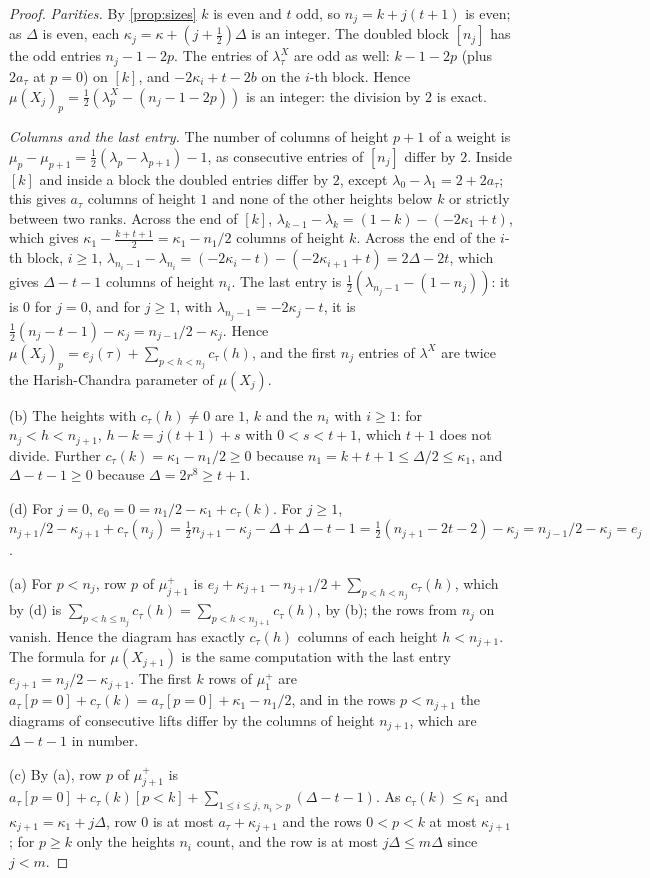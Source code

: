 \begin{proof}
\emph{Parities.} By \cref{prop:sizes} $k$ is even and $t$ odd, so $n_j=k+j(t+1)$ is even; as $\Delta$ is even, each $\kappa_j=\kappa+(j+\frac12)\Delta$ is an integer. The doubled block $[n_j]$ has the odd entries $n_j-1-2p$. The entries of $\lambda^X_\tau$ are odd as well: $k-1-2p$ (plus $2a_\tau$ at $p=0$) on $[k]$, and $-2\kappa_i+t-2b$ on the $i$-th block. Hence
$\mu(X_j)_p=\frac12(\lambda^X_p-(n_j-1-2p))$ is an integer: the division by $2$ is exact.

\emph{Columns and the last entry.} The number of columns of height $p+1$ of a weight is $\mu_p-\mu_{p+1}=\frac12(\lambda_p-\lambda_{p+1})-1$, as consecutive entries of $[n_j]$ differ by $2$. Inside $[k]$ and inside a block the doubled entries differ by $2$, except $\lambda_0-\lambda_1=2+2a_\tau$; this gives $a_\tau$ columns of height $1$ and none of the other
heights below $k$ or strictly between two ranks. Across the end of $[k]$, $\lambda_{k-1}-\lambda_k=(1-k)-(-2\kappa_1+t)$, which gives $\kappa_1-\frac{k+t+1}2=\kappa_1-n_1/2$ columns of height $k$. Across the end of the $i$-th block, $i\ge1$, $\lambda_{n_i-1}-\lambda_{n_i}=(-2\kappa_i-t)-(-2\kappa_{i+1}+t)=2\Delta-2t$, which gives $\Delta-t-1$ columns of height $n_i$. The
last entry is $\frac12(\lambda_{n_j-1}-(1-n_j))$: it is $0$ for $j=0$, and for $j\ge1$, with $\lambda_{n_j-1}=-2\kappa_j-t$, it is $\frac12(n_j-t-1)-\kappa_j=n_{j-1}/2-\kappa_j$. Hence $\mu(X_j)_p=e_j(\tau)+\sum_{p<h<n_j}c_\tau(h)$, and the first $n_j$ entries of $\lambda^X$ are twice the Harish-Chandra parameter of
$\mu(X_j)$.

(b) The heights with $c_\tau(h)\ne0$ are $1$, $k$ and the $n_i$ with $i\ge1$: for $n_j<h<n_{j+1}$, $h-k=j(t+1)+s$ with $0<s<t+1$, which $t+1$ does not divide. Further $c_\tau(k)=\kappa_1-n_1/2\ge0$ because $n_1=k+t+1\le\Delta/2\le\kappa_1$, and $\Delta-t-1\ge0$ because $\Delta=2r^8\ge t+1$.

(d) For $j=0$, $e_0=0=n_1/2-\kappa_1+c_\tau(k)$. For $j\ge1$, $n_{j+1}/2-\kappa_{j+1}+c_\tau(n_j)=\frac12n_{j+1}-\kappa_j-\Delta+\Delta-t-1=\frac12(n_{j+1}-2t-2)-\kappa_j=n_{j-1}/2-\kappa_j=e_j$.

(a) For $p<n_j$, row $p$ of $\mu^+_{j+1}$ is $e_j+\kappa_{j+1}-n_{j+1}/2+\sum_{p<h<n_j}c_\tau(h)$, which by (d) is $\sum_{p<h\le n_j}c_\tau(h)=\sum_{p<h<n_{j+1}}c_\tau(h)$, by (b); the rows from $n_j$ on vanish. Hence the diagram has exactly $c_\tau(h)$ columns of each height $h<n_{j+1}$. The formula for $\mu(X_{j+1})$ is the
same computation with the last entry $e_{j+1}=n_j/2-\kappa_{j+1}$. The first $k$ rows of $\mu^+_1$ are $a_\tau[p=0]+c_\tau(k)=a_\tau[p=0]+\kappa_1-n_1/2$, and in the rows $p<n_{j+1}$ the diagrams of consecutive lifts differ by the columns of height $n_{j+1}$, which are $\Delta-t-1$ in number.

(c) By (a), row $p$ of $\mu^+_{j+1}$ is $a_\tau[p=0]+c_\tau(k)[p<k]+\sum_{1\le i\le j,\,n_i>p}(\Delta-t-1)$. As $c_\tau(k)\le\kappa_1$ and $\kappa_{j+1}=\kappa_1+j\Delta$, row $0$ is at most $a_\tau+\kappa_{j+1}$ and the rows $0<p<k$ at most $\kappa_{j+1}$; for $p\ge k$ only the heights $n_i$ count, and the row is at most $j\Delta\le m\Delta$ since
$j<m$.
\end{proof}

